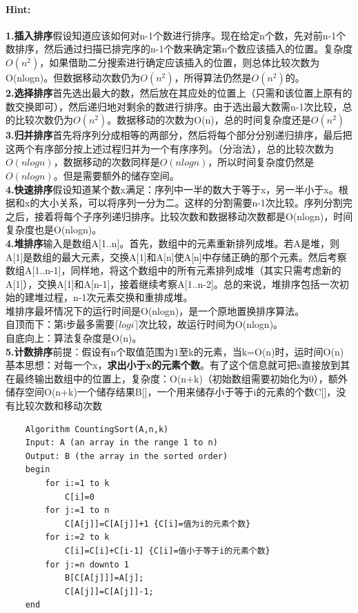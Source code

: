 \documentclass{article}
\begin{document}
     \paragraph{Hint:}\textbf{1.插入排序}假设知道应该如何对n-1个数进行排序。现在给定n个数，先对前n-1个数排序，然后通过扫描已排完序的n-1个数来确定第n个数应该插入的位置。复杂度$O(n^2)$，如果借助二分搜索进行确定应该插入的位置，则总体比较次数为O(nlogn)。但数据移动次数仍为$O(n^2)$，所得算法仍然是$O(n^2)$的。\\
     \textbf{2.选择排序}首先选出最大的数，然后放在其应处的位置上（只需和该位置上原有的数交换即可），然后递归地对剩余的数进行排序。由于选出最大数需n-1次比较，总的比较次数仍为$O(n^2)$。数据移动的次数为O(n)，总的时间复杂度还是$O(n^2)$\\
      \textbf{3.归并排序}首先将序列分成相等的两部分，然后将每个部分分别递归排序，最后把这两个有序部分按上述过程归并为一个有序序列。（分治法），总的比较次数为$O(nlogn)$，数据移动的次数同样是$O(nlogn)$，所以时间复杂度仍然是$O(nlogn)$。但是需要额外的储存空间。\\
       \textbf{4.快速排序}假设知道某个数x满足：序列中一半的数大于等于x，另一半小于x。根据和x的大小关系，可以将序列一分为二。这样的分割需要n-1次比较。序列分割完之后，接着将每个子序列递归排序。比较次数和数据移动次数都是O(nlogn)，时间复杂度也是O(nlogn)。\\
       \textbf{4.堆排序}输入是数组A[1..n]。首先，数组中的元素重新排列成堆。若A是堆，则A[1]是数组的最大元素，交换A[1]和A[n]使A[n]中存储正确的那个元素。然后考察数组A[1..n-1]，同样地，将这个数组中的所有元素排列成堆（其实只需考虑新的A[1]），交换A[1]和A[n-1]，接着继续考察A[1..n-2]。总的来说，堆排序包括一次初始的建堆过程，n-1次元素交换和重排成堆。\\
       堆排序最坏情况下的运行时间是O(nlogn)，是一个原地置换排序算法。\\
       自顶而下：第i步最多需要$\lceil logi \rceil$次比较，故运行时间为O(nlogn)。\\
       自底向上：算法复杂度是O(n)。\\
       \textbf{5.计数排序}前提：假设有n个取值范围为1至k的元素，当k=O(n)时，运时间O(n)\\
       基本思想：对每一个x，\textbf{求出小于x的元素个数}。有了这个信息就可把x直接放到其在最终输出数组中的位置上，复杂度：O(n+k)（初始数组需要初始化为0），额外储存空间O(n+k)一个储存结果B[]，一个用来储存小于等于i的元素的个数C[]，没有比较次数和移动次数\\
        \lstset{language=C}
    \begin{lstlisting}
    Algorithm CountingSort(A,n,k)
    Input: A (an array in the range 1 to n)
    Output: B (the array in the sorted order) 
    begin
        for i:=1 to k
            C[i]=0 
        for j:=1 to n
            C[A[j]]=C[A[j]]+1 {C[i]=值为i的元素个数}
        for i:=2 to k
            C[i]=C[i]+C[i-1] {C[i]=值小于等于i的元素个数}
        for j:=n downto 1
            B[C[A[j]]]=A[j]; 
            C[A[j]]=C[A[j]]-1; 
    end

    \end{lstlisting}
\end{document}
